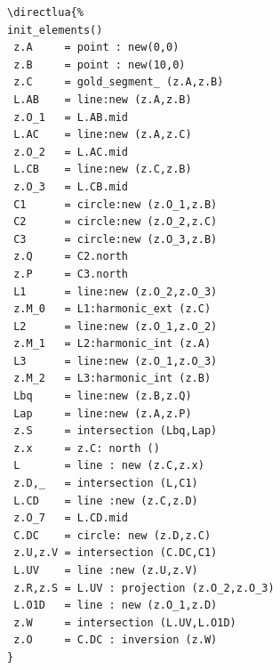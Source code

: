 \begin{minipage}{.4\textwidth}
\begin{Verbatim}
\directlua{%
init_elements()
 z.A     = point : new(0,0)
 z.B     = point : new(10,0)
 z.C     = gold_segment_ (z.A,z.B)
 L.AB    = line:new (z.A,z.B)
 z.O_1   = L.AB.mid
 L.AC    = line:new (z.A,z.C)
 z.O_2   = L.AC.mid
 L.CB    = line:new (z.C,z.B)
 z.O_3   = L.CB.mid
 C1      = circle:new (z.O_1,z.B)
 C2      = circle:new (z.O_2,z.C)
 C3      = circle:new (z.O_3,z.B)
 z.Q     = C2.north
 z.P     = C3.north
 L1      = line:new (z.O_2,z.O_3)
 z.M_0   = L1:harmonic_ext (z.C)
 L2      = line:new (z.O_1,z.O_2)
 z.M_1   = L2:harmonic_int (z.A)
 L3      = line:new (z.O_1,z.O_3)
 z.M_2   = L3:harmonic_int (z.B)
 Lbq     = line:new (z.B,z.Q)
 Lap     = line:new (z.A,z.P)
 z.S     = intersection (Lbq,Lap)
 z.x     = z.C: north ()
 L       = line : new (z.C,z.x)
 z.D,_   = intersection (L,C1)
 L.CD    = line :new (z.C,z.D)
 z.O_7   = L.CD.mid
 C.DC    = circle: new (z.D,z.C)
 z.U,z.V = intersection (C.DC,C1)
 L.UV    = line :new (z.U,z.V)
 z.R,z.S = L.UV : projection (z.O_2,z.O_3)
 L.O1D   = line : new (z.O_1,z.D)
 z.W     = intersection (L.UV,L.O1D)
 z.O     = C.DC : inversion (z.W)
}
\end{Verbatim}
\end{minipage}
\begin{minipage}{.6\textwidth}

\begin{center}
\end{center}


\end{minipage}

